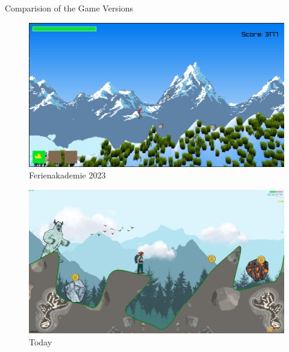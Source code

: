 \begin{frame}{Comparision of the Game Versions}
    \begin{minipage}{\textwidth}
        \centering
        \begin{minipage}{.495\textwidth}
            \begin{figure}
                \includegraphics[width=\textwidth]{../figures/old_game.jpeg}
                    \caption{Ferienakademie 2023\phantom{y}}
            \end{figure}

        \end{minipage}
        \begin{minipage}{.495\textwidth}

                \begin{figure}
                    \includegraphics[width=\textwidth]{../figures/new_game.png}
                    \caption{Today}
                \end{figure}

        \end{minipage}
    \end{minipage}
\end{frame}

